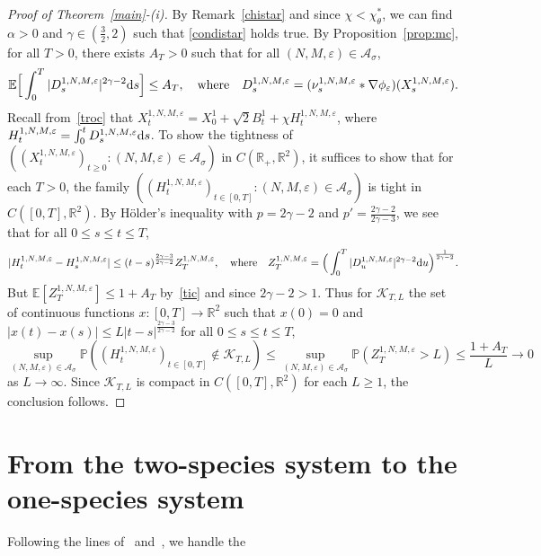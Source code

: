 \documentclass[11pt]{article}
\newcommand{\E}{\mathbb{E}}
\newcommand{\R}{\mathbb{R}}
\newcommand{\PP}{\mathbb{P}}
\newcommand{\1}{\mathbbm{1}}
\newcommand{\dd}{{\rm d}}
\newcommand{\Aa}{\mathcal A}
\newcommand{\Kk}{\mathcal K}
\newcommand{\e}{\varepsilon}
\newcommand{\vip}{\vskip5pt}
\begin{document}
\begin{proof}[Proof of Theorem~\ref{main}-(i)] By Remark~\ref{chistar} and since $\chi<\chi^*_\theta$, 
we can find $\alpha>0$ and  $\gamma \in (\frac32,2)$ such that \eqref{condistar} holds true.
By Proposition~\ref{prop:mc}, for all $T>0$, there exists $A_{T}>0$ such that for all $(N,M,\e)\in \Aa_\sigma$,
\begin{equation}\label{tic}
\E\Big[\int_0^T  |D^{1,N,M,\e}_s|^{2\gamma-2}\dd s\Big] \leq A_T,\quad\text{where}\quad D^{1,N,M,\e}_s=
(\nu^{1,N,M,\e}_s\ast \nabla \phi_\e)(X^{1,N,M,\e}_s).
\end{equation}
Recall from~\eqref{troc} that $X^{1,N,M,\e}_t=X^1_0+\sqrt 2 B^1_t+ \chi H^{1,N,M,\e}_t$,
where $H^{1,N,M,\e}_t=\int_0^t D^{1,N,M,\e}_s \dd s$.
To show the tightness of $((X^{1,N,M,\e}_t)_{t\geq 0} : (N,M,\e)\in \Aa_\sigma)$ in $C(\R_+,\R^2)$, 
it suffices to show that for each $T>0$, the family $((H^{1,N,M,\e}_t)_{t\in [0,T]}: (N,M,\e)\in \Aa_\sigma)$ 
is tight in $C([0,T],\R^2)$.
\vip
By Hölder's inequality with $p=2\gamma-2$ and $p'=\frac{2\gamma-2}{2\gamma-3}$, 
we see that for all $0\leq s \leq t \leq T$, 
$$
|H^{1,N,M,\e}_t-H^{1,N,M,\e}_s|\leq 
(t-s)^{\frac{2\gamma-3}{2\gamma-2}} Z^{1,N,M,\e}_T,
\quad \text{where} \quad Z^{1,N,M,\e}_T=\Big(\int_0^T  |D^{1,N,M,\e}_u|^{2\gamma-2}\dd u\Big)^{\frac{1}{2\gamma-2}}.
$$
But $\E[Z^{1,N,M,\e}_T]\leq 1+A_T$ by~\eqref{tic} and since $2\gamma-2>1$. Thus
for $\Kk_{T,L}$ the set of continuous functions $x:[0,T]\to \R^2$ such that $x(0)=0$ and 
$|x(t)-x(s)|\leq L|t-s|^{\frac{2\gamma-3}{2\gamma-2}}$ for all $0\leq s \leq t \leq T$,
$$
\sup_{(N,M,\e)\in \Aa_\sigma}\PP((H^{1,N,M,\e}_t)_{t\in [0,T]} \notin \Kk_{T,L}) \leq 
\sup_{(N,M,\e)\in \Aa_\sigma}\PP(Z^{1,N,M,\e}_T>L)\leq \frac{1+A_T}L \to 0
$$
as $L\to \infty$. Since $\Kk_{T,L}$ is compact in $C([0,T],\R^2)$ for each $L\geq 1$, the
conclusion follows.
\end{proof}


\section{From the two-species system to the one-species system}
\label{tstos}

Following the lines of~\cite[Theorem~5]{fournier-jourdain} and~\cite[Proposition~13]{FT1}, we handle the 
\end{document}
